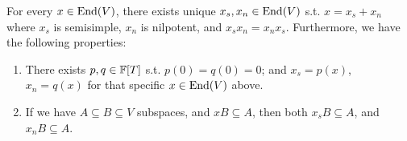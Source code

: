 \documentclass{article}
\begin{document}
\begin{proposition}\label{prop: Jordan Decomposition}
    For every $x \in \mathrm{End}(V)$, there exists unique $x_s, x_n \in \mathrm{End}(V)$ s.t. $x = x_s + x_n$ where $x_s$ is semisimple, $x_n$ is nilpotent, and $x_s x_n = x_n x_s$. Furthermore, we have the following properties:
    \begin{enumerate}[label=\arabic*)]
        \item There exists $p, q \in \mathbb{F}[T]$ s.t. $p(0) = q(0) = 0$; and $x_s = p(x)$, $x_n = q(x)$ for that specific $x \in \mathrm{End}(V)$ above.
        \item If we have $A \subseteq B \subseteq V$ subspaces, and $xB \subseteq A$, then both $x_s B \subseteq A$, and $x_n B\subseteq A$.
    \end{enumerate}
\end{proposition}
\end{document}
